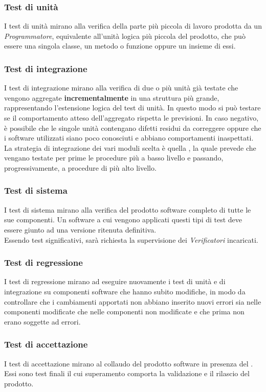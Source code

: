 \subsubsection{Test di unità}
I test di unità mirano alla verifica della parte più piccola di lavoro prodotta da un \emph{Programmatore}, equivalente all'unità logica più piccola del prodotto, che può essere una singola classe, un metodo o funzione oppure un insieme di essi.
\subsubsection{Test di integrazione}
I test di integrazione mirano alla verifica di due o più unità già testate che vengono aggregate \textbf{incrementalmente} in una struttura più grande, rappresentando l’estensione logica del test di unità. In questo modo si può testare se il comportamento atteso dell'aggregato rispetta le previsioni. In caso negativo, è possibile che le singole unità contengano difetti residui da correggere oppure che i software utilizzati siano poco conosciuti e abbiano comportamenti inaspettati.\\
La strategia di integrazione dei vari moduli scelta è quella , la quale prevede che vengano testate per prime le procedure più a basso livello e passando, progressivamente, a procedure di più alto livello. 
\subsubsection{Test di sistema}
I test di sistema mirano alla verifica del prodotto software completo di tutte le sue componenti. Un software a cui vengono applicati questi tipi di test deve essere giunto ad una versione ritenuta definitiva. \\
Essendo test significativi, sarà richiesta la supervisione dei \emph{Verificatori} incaricati.
\subsubsection{Test di regressione}
I test di regressione mirano ad eseguire nuovamente i test di unità e di integrazione su componenti software che hanno subito modifiche, in modo da controllare che i cambiamenti apportati non abbiano inserito nuovi errori sia nelle componenti modificate che nelle componenti non modificate e che prima non erano soggette ad errori.
\subsubsection{Test di accettazione}
I test di accettazione mirano al collaudo del prodotto software in presenza del . Essi sono test finali il cui superamento comporta la validazione e il rilascio del prodotto.

